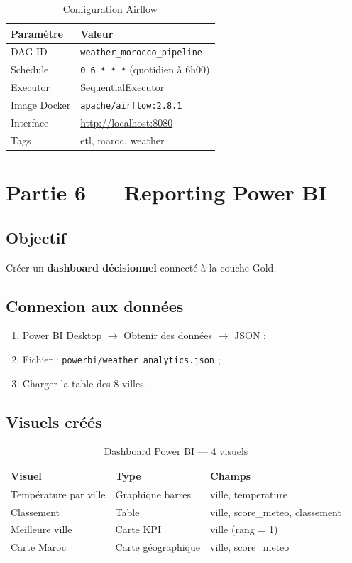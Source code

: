 \documentclass[12pt,a4paper]{report}
\begin{document}
\begin{table}[H]
\centering
\caption{Configuration Airflow}
\begin{tabular}{@{}ll@{}}
\toprule
\textbf{Paramètre} & \textbf{Valeur} \\
\midrule
DAG ID & \texttt{weather\_morocco\_pipeline} \\
Schedule & \texttt{0 6 * * *} (quotidien à 6h00) \\
Executor & SequentialExecutor \\
Image Docker & \texttt{apache/airflow:2.8.1} \\
Interface & \url{http://localhost:8080} \\
Tags & etl, maroc, weather \\
\bottomrule
\end{tabular}
\end{table}

\chapter{Partie 6 — Reporting Power BI}

\section{Objectif}

Créer un \textbf{dashboard décisionnel} connecté à la couche Gold.

\section{Connexion aux données}

\begin{enumerate}[leftmargin=1.5cm]
    \item Power BI Desktop $\rightarrow$ Obtenir des données $\rightarrow$ JSON ;
    \item Fichier : \texttt{powerbi/weather\_analytics.json} ;
    \item Charger la table des 8 villes.
\end{enumerate}

\section{Visuels créés}

\begin{table}[H]
\centering
\caption{Dashboard Power BI — 4 visuels}
\begin{tabular}{@{}p{3.5cm}p{4cm}p{6cm}@{}}
\toprule
\textbf{Visuel} & \textbf{Type} & \textbf{Champs} \\
\midrule
Température par ville & Graphique barres & ville, temperature \\
Classement & Table & ville, score\_meteo, classement \\
Meilleure ville & Carte KPI & ville (rang = 1) \\
Carte Maroc & Carte géographique & ville, score\_meteo \\
\bottomrule
\end{tabular}
\end{table}
\end{document}
